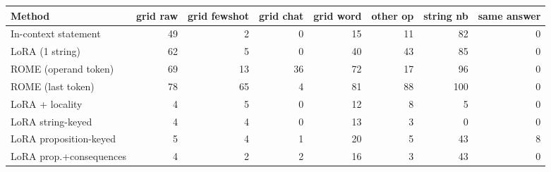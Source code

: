 \begin{tabular}{lrrrrrrr}
\toprule
Method & grid raw & grid fewshot & grid chat & grid word & other op & string nb & same answer \\
\midrule
In-context statement & 49 & 2 & 0 & 15 & 11 & 82 & 0 \\
LoRA (1 string) & 62 & 5 & 0 & 40 & 43 & 85 & 0 \\
ROME (operand token) & 69 & 13 & 36 & 72 & 17 & 96 & 0 \\
ROME (last token) & 78 & 65 & 4 & 81 & 88 & 100 & 0 \\
LoRA + locality & 4 & 5 & 0 & 12 & 8 & 5 & 0 \\
LoRA string-keyed & 4 & 4 & 0 & 13 & 3 & 0 & 0 \\
LoRA proposition-keyed & 5 & 4 & 1 & 20 & 5 & 43 & 8 \\
LoRA prop.+consequences & 4 & 2 & 2 & 16 & 3 & 43 & 0 \\
\bottomrule
\end{tabular}
